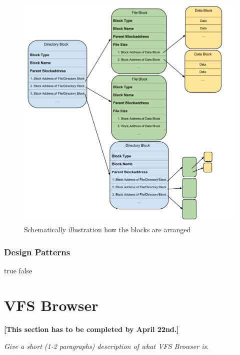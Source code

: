 \documentclass[a4paper,12pt]{article}
\begin{document}
\begin{figure}[h]
\begin{center}
\includegraphics[scale=0.4]{images/Blocks.pdf}
\caption{Schematically illustration how the blocks are arranged}
\label{blocks}

\end{center}
\end{figure}


\subsubsection{Design Patterns}

\ifx true false



\section{VFS Browser}

\textbf{[This section has to be completed by April 22nd.]}

\emph{Give a short (1-2 paragraphs) description of what VFS Browser is.}
\end{document}
